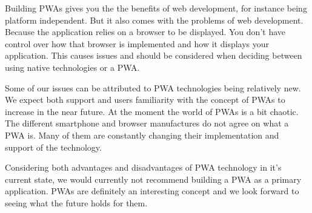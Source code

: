 \begin{markdown}
Building PWAs gives you the the benefits of web development, for instance being platform independent. But it also comes with the problems of web development. Because the application relies on a browser to be displayed. You don't have control over how that browser is implemented and how it displays your application. This causes issues and should be considered when deciding between using native technologies or a PWA.

Some of our issues can be attributed to PWA technologies being relatively new. We expect both support and users familiarity with the concept of PWAs to increase in the near future. At the moment the world of PWAs is a bit chaotic. The different smartphone and browser manufactures do not agree on what a PWA is. Many of them are constantly changing their implementation and support of the technology.

Considering both advantages and disadvantages of PWA technology in it's current state, we would currently not recommend building a PWA as a primary application. PWAs are definitely an interesting concept and we look forward to seeing what the future holds for them.

\end{markdown}

